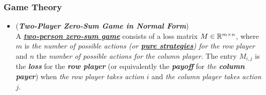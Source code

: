 \documentclass[11pt]{article}
\begin{document}
\subsubsection{Game Theory}
\begin{itemize}
%
\item \begin{definition}(\textbf{\emph{Two-Player Zero-Sum Game in Normal Form}})  \citep{schapire2012boosting, mohri2018foundations} \\
A \underline{\emph{\textbf{two-person zero-sum game}}} consists of a loss matrix $M \in {\mathbb R}^{m\times n}$, where $m$ is\emph{ the number of possible actions (or \underline{\textbf{pure strategies}}) for the row player} and $n$ the \emph{number of possible actions for the column player}. The entry $M_{i,j}$ is the \emph{\textbf{loss}} for the \emph{\textbf{row player}} (or equivalently the \emph{\textbf{payoff}} for \emph{the \textbf{column payer}}) when \emph{the row player takes action $i$} and \emph{the column player takes action $j$}.
\end{definition}


\end{itemize}
\end{document}
